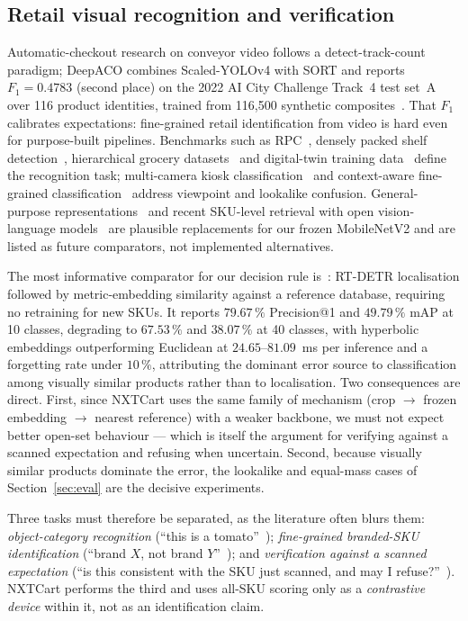 \documentclass[conference]{IEEEtran}
\begin{document}
\subsection{Retail visual recognition and verification}
Automatic-checkout research on conveyor video follows a detect-track-count paradigm; DeepACO combines
Scaled-YOLOv4 with SORT and reports $F_1 = 0.4783$ (second place) on the 2022 AI City Challenge
Track~4 test set~A over 116 product identities, trained from 116{,}500 synthetic
composites~\cite{R27}. That $F_1$ calibrates expectations: fine-grained retail identification from
video is hard even for purpose-built pipelines. Benchmarks such as RPC~\cite{R42}, densely packed
shelf detection~\cite{R38}, hierarchical grocery datasets~\cite{R39} and digital-twin training
data~\cite{R63} define the recognition task; multi-camera kiosk classification~\cite{R08} and
context-aware fine-grained classification~\cite{R30} address viewpoint and lookalike confusion.
General-purpose representations~\cite{R58,R59} and recent SKU-level retrieval with open
vision-language models~\cite{R62} are plausible replacements for our frozen MobileNetV2 and are listed
as future comparators, not implemented alternatives.

The most informative comparator for our decision rule is~\cite{R07}: RT-DETR localisation followed by
metric-embedding similarity against a reference database, requiring no retraining for new SKUs. It
reports $79.67\,\%$ Precision@1 and $49.79\,\%$ mAP at 10 classes, degrading to $67.53\,\%$ and
$38.07\,\%$ at 40 classes, with hyperbolic embeddings outperforming Euclidean at
$24.65$--$81.09$~ms per inference and a forgetting rate under $10\,\%$, attributing the dominant error
source to classification among visually similar products rather than to localisation. Two
consequences are direct. First, since NXTCart uses the same family of mechanism (crop $\rightarrow$
frozen embedding $\rightarrow$ nearest reference) with a weaker backbone, we must not expect better
open-set behaviour --- which is itself the argument for verifying against a scanned expectation and
refusing when uncertain. Second, because visually similar products dominate the error, the lookalike
and equal-mass cases of Section~\ref{sec:eval} are the decisive experiments.

Three tasks must therefore be separated, as the literature often blurs them:
\emph{object-category recognition} (``this is a tomato''~\cite{R04}); \emph{fine-grained branded-SKU
identification} (``brand $X$, not brand $Y$''~\cite{R07,R27,R42,R30}); and \emph{verification against
a scanned expectation} (``is this consistent with the SKU just scanned, and may I
refuse?''~\cite{R51,R52}). NXTCart performs the third and uses all-SKU scoring only as a
\emph{contrastive device} within it, not as an identification claim.
\end{document}
